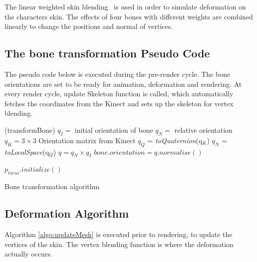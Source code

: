 The linear weighted skin blending~\cite{Kavan2003} is used in order to simulate deformation on the characters skin. The effects of four bones with different weights are combined linearly to change the positions and normal of vertices.

\subsection{The bone transformation Pseudo Code}

The pseudo code below is executed during the pre-render cycle. The bone orientations are set to be ready for animation, deformation and rendering. At every render cycle, update Skeleton function is called, which automatically fetches the coordinates from the Kinect and sets up the skeleton for vertex blending. 

\begin{algorithm}[ht]
\DontPrintSemicolon %
\function(transformBone){
$q_I =$ initial orientation of bone\;
$q_N =$ relative orientation\;
$q_K = 3\times3$ Orientation matrix from Kinect\;
 {
  $q_Q$ = \textit{toQuaternion}(q$_K$)\;
  $q_N$ = \textit{toLocalSpace}(q$_Q$)\;
  $q = q_N \times q_I$\;
  $\textit{bone.orientation} = \textit{q.normalise}{\left(\right)}$\; }}

 {
  $p_\textit{torso}.\textit{initialize}()$  \;
 }
\caption{Bone transformation algorithm}
\label{algo:transformBone}
\end{algorithm}

\subsection{Deformation Algorithm}

Algorithm \ref{algo:updateMesh} is executed prior to rendering, to update the vertices of the skin. The vertex blending function is where the deformation
actually occurs.

